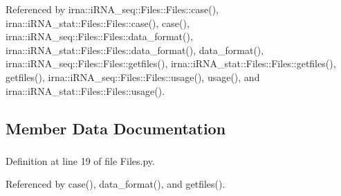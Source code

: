 \-Referenced by irna\-::i\-R\-N\-A\-\_\-seq\-::\-Files\-::\-Files\-::case(), irna\-::i\-R\-N\-A\-\_\-stat\-::\-Files\-::\-Files\-::case(), case(), irna\-::i\-R\-N\-A\-\_\-seq\-::\-Files\-::\-Files\-::data\-\_\-format(), irna\-::i\-R\-N\-A\-\_\-stat\-::\-Files\-::\-Files\-::data\-\_\-format(), data\-\_\-format(), irna\-::i\-R\-N\-A\-\_\-seq\-::\-Files\-::\-Files\-::getfiles(), irna\-::i\-R\-N\-A\-\_\-stat\-::\-Files\-::\-Files\-::getfiles(), getfiles(), irna\-::i\-R\-N\-A\-\_\-seq\-::\-Files\-::\-Files\-::usage(), usage(), and irna\-::i\-R\-N\-A\-\_\-stat\-::\-Files\-::\-Files\-::usage().



\subsection{\-Member \-Data \-Documentation}
\hypertarget{classirna_1_1iRNA__pred_1_1Files_1_1Files_a3ea4359bccb654a1743532a09c941884}{
\subsubsection[{fasta}]{}}
\label{classirna_1_1iRNA__pred_1_1Files_1_1Files_a3ea4359bccb654a1743532a09c941884}


\-Definition at line 19 of file \-Files.\-py.



\-Referenced by case(), data\-\_\-format(), and getfiles().

\hypertarget{classirna_1_1iRNA__pred_1_1Files_1_1Files_a8c20f944a85dff1a3fd90ca1f29928cd}{
\subsubsection[{fastmode}]{}}
\label{classirna_1_1iRNA__pred_1_1Files_1_1Files_a8c20f944a85dff1a3fd90ca1f29928cd}


